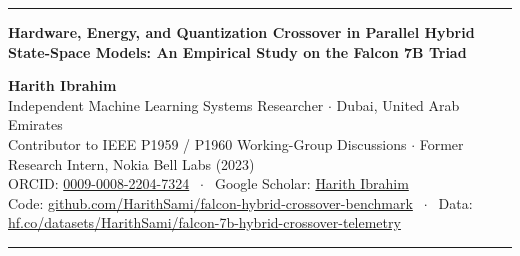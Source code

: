 \documentclass[10pt,a4paper]{article}
\begin{document}
\thispagestyle{plain}

\noindent\textcolor{rulecolor}{\rule{\textwidth}{1.5pt}}
\vspace{4pt}
\begin{center}
    {\LARGE\bfseries Hardware, Energy, and Quantization Crossover in Parallel Hybrid State-Space Models: An Empirical Study on the Falcon 7B Triad \par}
    \vspace{10pt}
    {\normalsize\bfseries Harith Ibrahim}\\[2pt]
    {\small Independent Machine Learning Systems Researcher $\cdot$ Dubai, United Arab Emirates}\\[1pt]
    {\small Contributor to IEEE P1959 / P1960 Working-Group Discussions $\cdot$ Former Research Intern, Nokia Bell Labs (2023)}\\[3pt]
    {\footnotesize ORCID: \href{https://orcid.org/0009-0008-2204-7324}{0009-0008-2204-7324} $\;\cdot\;$
    Google Scholar: \href{https://scholar.google.co.uk/citations?user=D0ZI6BoAAAAJ}{Harith Ibrahim}}\\[1pt]
    {\footnotesize Code: \href{https://github.com/HarithSami/falcon-hybrid-crossover-benchmark}{github.com/HarithSami/falcon-hybrid-crossover-benchmark} $\;\cdot\;$
    Data: \href{https://huggingface.co/datasets/HarithSami/falcon-7b-hybrid-crossover-telemetry}{hf.co/datasets/HarithSami/falcon-7b-hybrid-crossover-telemetry}}
\end{center}
\vspace{2pt}
\noindent\textcolor{rulecolor}{\rule{\textwidth}{0.6pt}}
\vspace{6pt}
\end{document}
